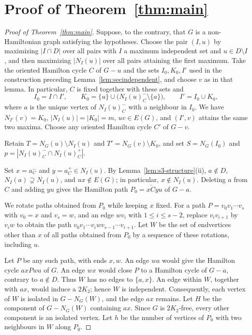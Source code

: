 \documentclass[11pt]{article}
\numberwithin{equation}{section}
\theoremstyle{plain}
\theoremstyle{definition}
\theoremstyle{plain}
\begin{document}
\section{Proof of Theorem~\ref{thm:main}}
\label{sec:proof}

\begin{proof}[Proof of Theorem~\ref{thm:main}]
Suppose, to the contrary, that $G$ is a non-Hamiltonian graph satisfying
the hypotheses.
Choose the pair $(I,u)$ by maximizing $|I\cap D|$ over all pairs
with $I$ a maximum independent set and $u\in D\setminus I$, and
then maximizing $|N_I(u)|$ over all pairs attaining the first maximum.
Take the oriented Hamilton cycle $C$ of $G-u$ and the sets
$I_0,K_0,I'$ used in the construction preceding
Lemma~\ref{lem:secindependent}, and choose $v$ as in that lemma.
In particular, $C$ is fixed together with these sets and
\[
 I_0=I\cap I',\qquad
 K_0=\{u\}\cup\bigl(N_I(u)_C^-\setminus\{a\}\bigr),\qquad
 I'=I_0\cup K_0,
\]
where $a$ is the unique vertex of $N_I(u)_C^-$ with a neighbour
in $I_0$. We have $N_{I'}(v)=K_0$, $|N_I(u)|=|K_0|=m$,
$uv\in E(G)$, and $(I',v)$ attains the same two maxima.
Choose any oriented Hamilton cycle $C'$ of $G-v$.

Retain $T=N_G(u)\setminus N_I(u)$ and
$T'=N_G(v)\setminus K_0$, and   set
$S=N_G(I_0)$ and
$p=|N_I(u)_C^-\cap N_I(u)_C^+|$.

  Set $x=a_C^-$ and $y=a_C^+\in N_I(u)$.
By Lemma~\ref{lem:s3-structure}\textup{(ii)}, $a\notin D$,
$N_I(a)\supsetneq N_I(u)$, and $ux\notin E(G)$; in particular,
$x\notin N_I(u)$.
Deleting $a$ from $C$ and adding $yu$ gives the Hamilton path
$P_0=x\overleftarrow{C}yu$ of $G-a$.

We rotate paths obtained from $P_0$ while keeping $x$ fixed.
For a path $P=v_0v_1\cdots v_s$ with $v_0=x$ and $v_s=w$,
and an edge $wv_i$ with $1\leq i\leq s-2$, replace
$v_iv_{i+1}$ by $v_iw$ to obtain the path
$v_0v_1\cdots v_iwv_{s-1}\cdots v_{i+1}$.
Let $W$ be the set of endvertices other than $x$ of all paths obtained
from $P_0$ by a sequence of these rotations, including $u$.

Let $P$ be any such path, with ends $x,w$.
An edge $wa$ would give the Hamilton cycle $axPwa$ of $G$.
An edge $wx$ would close $P$ to a Hamilton cycle of $G-a$,
contrary to $a\notin D$.
Thus $W$ has no edges to $\{a,x\}$.
An edge within $W$, together with $ax$, would induce a $2K_2$;
hence $W$ is independent.
Consequently, each vertex of $W$ is isolated in $G-N_G(W)$,
and the edge $ax$ remains.
Let $H$ be the component of $G-N_G(W)$ containing $ax$.
Since $G$ is $2K_2$-free, every other component is an isolated vertex.
Let $h$ be the number of vertices of $P_0$ with two neighbours in $W$
along $P_0$.


\end{proof}
\end{document}
